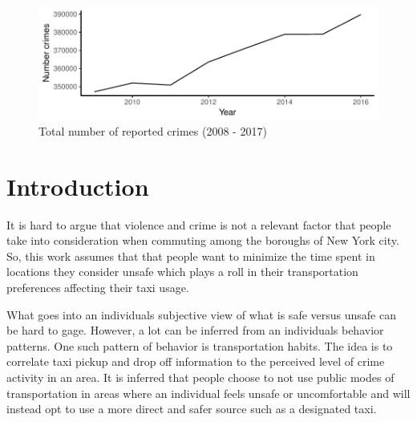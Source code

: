 \documentclass{sigkddExp}
\begin{document}
\begin{figure}
\caption{Total number of reported crimes (2008 - 2017)}
\label{total_crimes}
\centering \includegraphics[width=.45\textwidth]{../img/total_crimes.pdf}
\end{figure}





\section{Introduction}

It is hard to argue that violence and crime is not a relevant factor that people take into consideration when commuting among the boroughs of New York city. 
So, this work assumes that that people want to minimize the time spent in locations they consider unsafe which  plays a roll in their transportation preferences affecting their taxi usage. 

What goes into an individuals subjective view of what is safe versus unsafe can be hard to gage. However, a lot can be inferred from an individuals behavior patterns.
One such pattern of behavior is transportation habits. The idea is to correlate taxi pickup and drop off information to the perceived level of crime activity in an area. 
It is inferred that people choose to not use public modes of transportation in areas where an individual feels unsafe or uncomfortable and will instead opt to use a more direct and safer source such as a designated taxi. 
\end{document}
